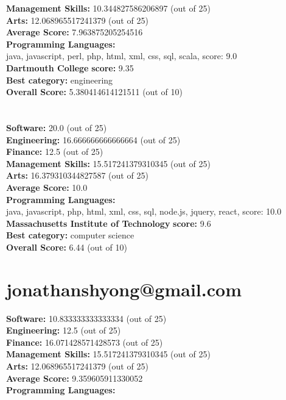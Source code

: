 \documentclass{article}
\begin{document}
\textbf{Management Skills:} 10.344827586206897 (out of 25)\\
\textbf{Arts:} 12.068965517241379 (out of 25)\\
\textbf{Average Score: } 7.963875205254516\\
\textbf{Programming Languages:} \\
java, javascript, perl, php, html, xml, css, sql, scala, score: 9.0\\
\textbf{Dartmouth College} \textbf{score:} 9.35\\
\textbf{Best category: } engineering\\
\textbf{Overall Score: }5.380414614121511 (out of 10)\section{}
\textbf{Software:} 20.0 (out of 25)\\
\textbf{Engineering: } 16.666666666666664 (out of 25)\\
\textbf{Finance:} 12.5 (out of 25)\\
\textbf{Management Skills:} 15.517241379310345 (out of 25)\\
\textbf{Arts:} 16.379310344827587 (out of 25)\\
\textbf{Average Score: } 10.0\\
\textbf{Programming Languages:} \\
java, javascript, php, html, xml, css, sql, node.js, jquery, react, score: 10.0\\
\textbf{Massachusetts Institute of Technology} \textbf{score:} 9.6\\
\textbf{Best category: } computer science\\
\textbf{Overall Score: }6.44 (out of 10)\section{jonathanshyong@gmail.com}
\textbf{Software:} 10.833333333333334 (out of 25)\\
\textbf{Engineering: } 12.5 (out of 25)\\
\textbf{Finance:} 16.071428571428573 (out of 25)\\
\textbf{Management Skills:} 15.517241379310345 (out of 25)\\
\textbf{Arts:} 12.068965517241379 (out of 25)\\
\textbf{Average Score: } 9.359605911330052\\
\textbf{Programming Languages:} \\
\end{document}
